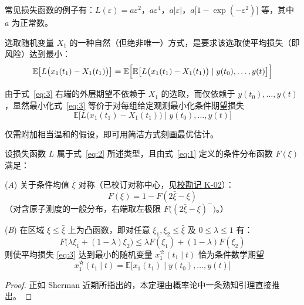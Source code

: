 常见损失函数的例子有：$L(\varepsilon) = a\varepsilon^2$，$a\varepsilon^4$，$a|\varepsilon|$，$a\bigl[1 - \exp(-\varepsilon^2)\bigr]$ 等，其中 $a$ 为正常数。

选取随机变量 $X_1$ 的一种自然（但绝非唯一）方式，是要求该选取使平均损失（即风险）达到最小：
\begin{equation}\label{eq:3}
\mathbb{E}\bigl[L\bigl(x_1(t_1) - X_1(t_1)\bigr)\bigr] = \mathbb{E}\Bigl[\mathbb{E}\bigl[L\bigl(x_1(t_1) - X_1(t_1)\bigr) \mid y(t_0), \dots, y(t)\bigr]\Bigr]
\end{equation}

由于式~\eqref{eq:3} 右端的外层期望不依赖于 $X_1$ 的选取，而仅依赖于 $y(t_0), \dots, y(t)$，显然最小化式~\eqref{eq:3} 等价于对每组给定观测最小化条件期望损失
\begin{equation}\label{eq:4}
\mathbb{E}\bigl[L\bigl(x_1(t_1) - X_1(t_1)\bigr) \mid y(t_0), \dots, y(t)\bigr]
\end{equation}

仅需附加相当温和的假设，即可用简洁方式刻画最优估计。

\begin{theorem}\label{thm:1}

设损失函数 $L$ 属于式~\eqref{eq:2} 所述类型，且由式~\eqref{eq:1} 定义的条件分布函数 $F(\xi)$ 满足：

(\emph{A}) 关于条件均值 $\bar{\xi}$ 对称（已校订对称中心，见\hyperref[sec:k02]{校勘记 K-02}）：
\begin{equation*}
F(\xi) = 1 - F(2\bar{\xi} - \xi)
\end{equation*}
（对含原子测度的一般分布，右端取左极限 $F\bigl((2\bar{\xi} - \xi)^-\bigr)$。）

(\emph{B}) 在区域 $\xi \leq \bar{\xi}$ 上为凸函数，即对任意 $\xi_1, \xi_2 \leq \bar{\xi}$ 及 $0 \leq \lambda \leq 1$ 有：
\begin{equation*}
F\bigl(\lambda\xi_1 + (1 - \lambda)\xi_2\bigr) \leq \lambda F(\xi_1) + (1 - \lambda)F(\xi_2)
\end{equation*}
则使平均损失 \eqref{eq:3} 达到最小的随机变量 $x_1^{\text{✫}}(t_1 \mid t)$ 恰为条件数学期望
\begin{equation}\label{eq:5}
x_1^{\text{✫}}(t_1 \mid t) = \mathbb{E}\bigl[x_1(t_1) \mid y(t_0), \dots, y(t)\bigr]
\end{equation}
\end{theorem}

\begin{proof}

正如 Sherman \cite{r25} 近期所指出的，本定理由概率论中一条熟知引理直接推出。

\end{proof}

